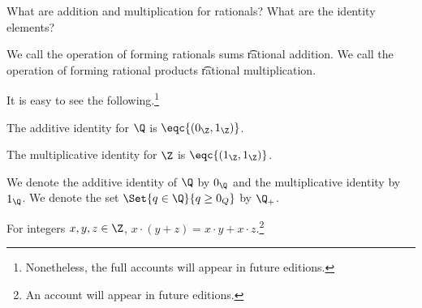 

What are addition and multiplication for rationals?
What are the identity elements?


We call the operation of forming rationals sums \t{rational addition}.
We call the operation of forming rational products \t{rational multiplication}.


It is easy to see the following.\footnote{Nonetheless, the full accounts will appear in future editions.}

\begin{proposition}
  The additive identity for $\Q$ is $\eqc{(0_{\Z}, 1_{\Z})}$.
\end{proposition}

\begin{proposition}
  The multiplicative identity for $\Z$ is $\eqc{(1_{\Z}, 1_{\Z})}$.
\end{proposition}


We denote the additive identity of $\Q$ by $0_{\Q}$ and the multiplicative identity by $1_{\Q}$.
We denote the set $\Set{q \in \Q}{q \geq 0_{Q}}$ by $\Q_{+}$.


\begin{proposition}
  For integers $x, y, z \in \Z$, $x \cdot (y + z) = x\cdot y + x\cdot z$.\footnote{An account will appear in future editions.}
\end{proposition}

\blankpage
